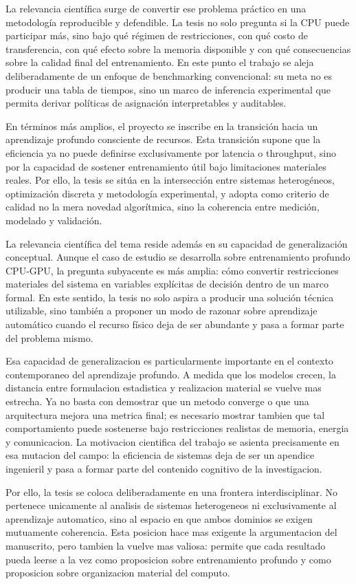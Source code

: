 La relevancia científica surge de convertir ese problema práctico en una metodología reproducible y defendible. La tesis no solo pregunta si la CPU puede participar más, sino bajo qué régimen de restricciones, con qué costo de transferencia, con qué efecto sobre la memoria disponible y con qué consecuencias sobre la calidad final del entrenamiento. En este punto el trabajo se aleja deliberadamente de un enfoque de benchmarking convencional: su meta no es producir una tabla de tiempos, sino un marco de inferencia experimental que permita derivar políticas de asignación interpretables y auditables.

En términos más amplios, el proyecto se inscribe en la transición hacia un aprendizaje profundo consciente de recursos. Esta transición supone que la eficiencia ya no puede definirse exclusivamente por latencia o throughput, sino por la capacidad de sostener entrenamiento útil bajo limitaciones materiales reales. Por ello, la tesis se sitúa en la intersección entre sistemas heterogéneos, optimización discreta y metodología experimental, y adopta como criterio de calidad no la mera novedad algorítmica, sino la coherencia entre medición, modelado y validación.

La relevancia científica del tema reside además en su capacidad de generalización conceptual. Aunque el caso de estudio se desarrolla sobre entrenamiento profundo CPU-GPU, la pregunta subyacente es más amplia: cómo convertir restricciones materiales del sistema en variables explícitas de decisión dentro de un marco formal. En este sentido, la tesis no solo aspira a producir una solución técnica utilizable, sino también a proponer un modo de razonar sobre aprendizaje automático cuando el recurso físico deja de ser abundante y pasa a formar parte del problema mismo.

Esa capacidad de generalizacion es particularmente importante en el contexto contemporaneo del aprendizaje profundo. A medida que los modelos crecen, la distancia entre formulacion estadistica y realizacion material se vuelve mas estrecha. Ya no basta con demostrar que un metodo converge o que una arquitectura mejora una metrica final; es necesario mostrar tambien que tal comportamiento puede sostenerse bajo restricciones realistas de memoria, energia y comunicacion. La motivacion cientifica del trabajo se asienta precisamente en esa mutacion del campo: la eficiencia de sistemas deja de ser un apendice ingenieril y pasa a formar parte del contenido cognitivo de la investigacion.

Por ello, la tesis se coloca deliberadamente en una frontera interdisciplinar. No pertenece unicamente al analisis de sistemas heterogeneos ni exclusivamente al aprendizaje automatico, sino al espacio en que ambos dominios se exigen mutuamente coherencia. Esta posicion hace mas exigente la argumentacion del manuscrito, pero tambien la vuelve mas valiosa: permite que cada resultado pueda leerse a la vez como proposicion sobre entrenamiento profundo y como proposicion sobre organizacion material del computo.

